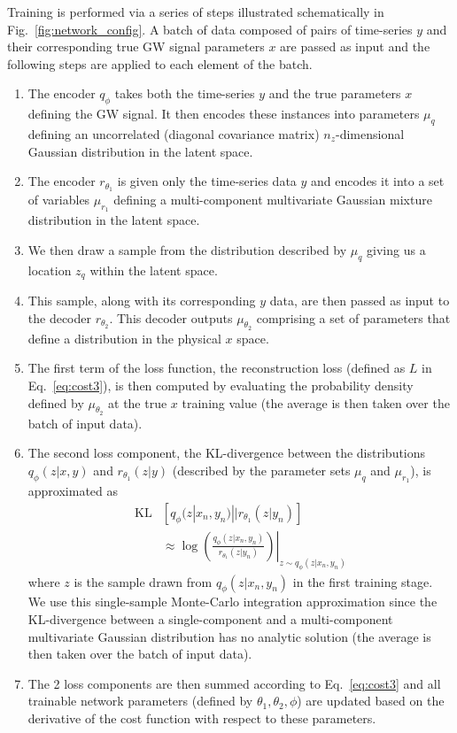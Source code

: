 %
%
Training is performed via a series of steps illustrated schematically in
Fig.~\ref{fig:network_config}. A batch of data composed of pairs of
time-series $y$ and their corresponding true \ac{GW} signal parameters $x$ are
passed as input and the following steps are applied to each element of the
batch.
%
\begin{enumerate}
%
\item The encoder $q_{\phi}$ takes both the time-series
$y$ and the true parameters $x$ defining the \ac{GW} signal. It then encodes
these instances into parameters $\mu_{q}$ defining an uncorrelated (diagonal covariance matrix)
$n_z$-dimensional Gaussian distribution in the latent space. 
%
\item The encoder $r_{\theta_1}$ is given only the time-series data
$y$ and encodes it into a set of variables $\mu_{r_1}$ defining a
multi-component multivariate Gaussian mixture distribution
in the latent space.
%
\item We then draw a sample from the distribution described by $\mu_{q}$ giving us
a location $z_{q}$ within the latent space.
%
\item This sample, along with its corresponding $y$ data, are then passed
as input to the decoder $r_{\theta_2}$. This decoder outputs $\mu_{\theta_2}$
comprising a set of parameters that define a distribution in the physical $x$
space. 
\item The first term of the loss function, the reconstruction loss (defined as $L$ in
Eq.~\ref{eq:cost3}), is then computed by evaluating the probability density
defined by $\mu_{\theta_2}$ at the true $x$ training value (the average
is then taken over the batch of input data). 
%
\item The second loss component, the \ac{KL}-divergence between
the distributions $q_{\phi}(z|x,y)$ and $r_{\theta_1}(z|y)$ (described by
the parameter sets $\mu_{q}$ and $\mu_{r_1}$), is approximated as 
%
\begin{align}\label{eq:klgauss}
\text{KL}&\left[ q_{\phi}(z|x_{n},y_{n})||r_{\theta_{1}}(z|y_{n})\right] \\
&\approx \left.\log\left(\frac{q_{\phi}(z|x_n,y_n)}{r_{\theta_1}(z|y_n)}\right)\right|_{z\sim
q_{\phi}(z|x_n,y_n)}\nonumber
\end{align}
%
where $z$ is the sample drawn from $q_{\phi}(z|x_n,y_n)$ in the first
training stage. We use this single-sample Monte-Carlo integration approximation
since the \ac{KL}-divergence between a single-component and a multi-component
multivariate Gaussian distribution has no analytic solution (the average
is then taken over the batch of input data). 
%
\item The 2 loss components are then summed according to Eq.~\ref{eq:cost3} and
all trainable network parameters (defined by $\theta_1,\theta_2,\phi$) are
updated based on the derivative of the cost function with respect to these
parameters.
%
\end{enumerate}

